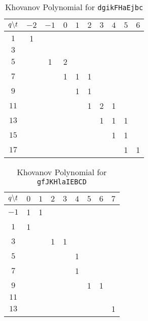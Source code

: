 \documentclass{article}
\theoremstyle{plain}
\begin{document}
        \begin{table}[H]
            \centering
            \begin{tabular}{| c | c | c | c | c | c | c | c | c | c |}
                \hline
                $q\symbol{92}t$&$-2$&$-1$&$0$&$1$&$2$&$3$&$4$&$5$&$6$\\
                \hline
                $1$&1&&&&&&&&\\
                \hline
                $3$&&&&&&&&&\\
                \hline
                $5$&&1&2&&&&&&\\
                \hline
                $7$&&&1&1&1&&&&\\
                \hline
                $9$&&&&1&1&&&&\\
                \hline
                $11$&&&&&1&2&1&&\\
                \hline
                $13$&&&&&&1&1&1&\\
                \hline
                $15$&&&&&&&1&1&\\
                \hline
                $17$&&&&&&&&1&1\\
                \hline
            \end{tabular}
            \caption{Khovanov Polynomial for \texttt{dgikFHaEjbc}}
            \label{table:dgikFHaEjbc_kho}
        \end{table}
        \begin{table}[H]
            \centering
            \begin{tabular}{| c | c | c | c | c | c | c | c | c |}
                \hline
                $q\symbol{92}t$&$0$&$1$&$2$&$3$&$4$&$5$&$6$&$7$\\
                \hline
                $-1$&1&1&&&&&&\\
                \hline
                $1$&1&&&&&&&\\
                \hline
                $3$&&&1&1&&&&\\
                \hline
                $5$&&&&&1&&&\\
                \hline
                $7$&&&&&1&&&\\
                \hline
                $9$&&&&&&1&1&\\
                \hline
                $11$&&&&&&&&\\
                \hline
                $13$&&&&&&&&1\\
                \hline
            \end{tabular}
            \caption{Khovanov Polynomial for \texttt{gfJKHlaIEBCD}}
            \label{table:gfJKHlaIEBCD_kho}
        \end{table}
\end{document}
